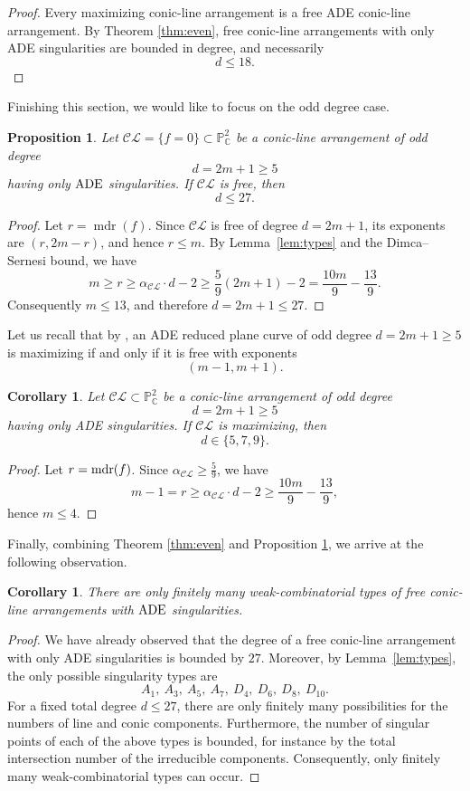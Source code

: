 \documentclass[11pt]{article}
\newtheorem{proposition}[theorem]{Proposition}
\newtheorem{corollary}[theorem]{Corollary}
\theoremstyle{remark}
\begin{document}
\begin{proof}
Every maximizing conic-line arrangement is a free
ADE conic-line arrangement. By Theorem \ref{thm:even}, free conic-line arrangements with only ADE singularities are bounded in degree, and necessarily
\[
d\leq 18.
\]
\end{proof}
Finishing this section, we would like to focus on the odd degree case.
\begin{proposition}
\label{odd}
Let $\mathcal{CL} = \{f=0\} \subset \mathbb{P}^{2}_{\mathbb{C}}$ be a conic-line arrangement of odd degree
$$d = 2m+1 \geq 5$$
having only ${\rm ADE}$ singularities. If $\mathcal{CL}$ is free, then
$$d \leq 27.$$
\end{proposition}
\begin{proof}
Let $r=\operatorname{mdr}(f)$. Since $\mathcal{CL}$ is free of degree
$d=2m+1$, its exponents are $(r,2m-r)$, and hence $r\leq m$.
By Lemma~\ref{lem:types} and the Dimca--Sernesi bound, we have
\[
m\geq r\geq \alpha_{\mathcal{CL}}\cdot d-2
\geq \frac{5}{9}(2m+1)-2
=\frac{10m}{9}-\frac{13}{9}.
\]
Consequently $m\leq 13$, and therefore $d=2m+1\leq 27$.
\end{proof}
Let us recall that by \cite[Proposition 5.1(a)]{max}, an ADE reduced plane curve of odd degree $d=2m+1 \geq 5$ is maximizing if and only if it is free with exponents
\[
(m-1,m+1).
\]
\begin{corollary}
Let $\mathcal{CL}\subset \mathbb{P}^2_{\mathbb{C}}$ be a conic-line arrangement of odd degree
\[
d=2m+1\geq 5
\]
having only ADE singularities. If $\mathcal{CL}$ is maximizing, then
\[
d \in \{5,7,9\}.
\]
\end{corollary}
\begin{proof}
Let $r = {\rm mdr}(f)$. Since $\alpha_{\mathcal{CL}} \geq \frac{5}{9}$, we have
$$ m-1 = r \geq \alpha_{\mathcal{CL}}\cdot d -2  \geq  \frac{10m}{9} - \frac{13}{9},$$
hence $m \leq 4$.
\end{proof}
Finally, combining Theorem \ref{thm:even} and Proposition \ref{odd}, we arrive at the following observation.
\begin{corollary}
There are only finitely many weak-combinatorial types of free conic-line arrangements with ${\rm ADE}$ singularities.
\end{corollary}
\begin{proof}
We have already observed that the degree of a free conic-line
arrangement with only ADE singularities is bounded by $27$. Moreover,
by Lemma~\ref{lem:types}, the only possible singularity types are
\[
A_1,\ A_3,\ A_5,\ A_7,\ D_4,\ D_6,\ D_8,\ D_{10}.
\]
For a fixed total degree $d\leq 27$, there are only finitely many
possibilities for the numbers of line and conic components. Furthermore,
the number of singular points of each of the above types is bounded,
for instance by the total intersection number of the irreducible
components. Consequently, only finitely many weak-combinatorial types
can occur.
\end{proof}
\end{document}
